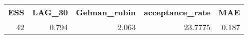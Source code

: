 \begin{longtable}{rrrrr}
\toprule
ESS & LAG\_30 & Gelman\_rubin & acceptance\_rate & MAE \\ 
\midrule
42 & 0.794 & 2.063 & 23.7775 & 0.187 \\ 
\bottomrule
\end{longtable}

